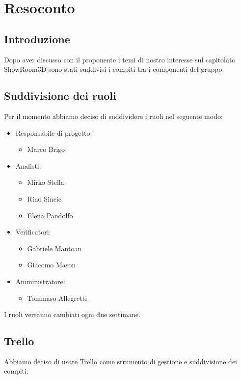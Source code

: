 \section{Resoconto}
\subsection{Introduzione}
Dopo aver discusso con il proponente i temi di nostro interesse sul capitolato ShowRoom3D 
sono stati suddivisi i compiti tra i componenti del gruppo.
\subsection{Suddivisione dei ruoli}
Per il momento abbiamo deciso di suddividere i ruoli nel seguente modo:
\begin{itemize}
    \item Responsabile di progetto:
    \begin{itemize}
        \item Marco Brigo
    \end{itemize}
    \item Analisti:
    \begin{itemize}
        \item Mirko Stella
        \item Rino Sincic
        \item Elena Pandolfo
    \end{itemize}
    \item Verificatori:
    \begin{itemize}
        \item Gabriele Mantoan
        \item Giacomo Mason
    \end{itemize}
    \item Amministratore:
    \begin{itemize}
        \item Tommaso Allegretti
    \end{itemize}
\end{itemize}
I ruoli verranno cambiati ogni due settimane.

\subsection{Trello}
Abbiamo deciso di usare Trello come strumento di gestione e suddivisione dei compiti.

